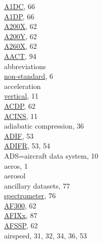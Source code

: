 \documentclass[
  english,
]{book}
\begin{document}
\href{./5-cloud-physics-variables.html\#a1dc-a1dp}{A1DC}, 66\\
\href{./5-cloud-physics-variables.html\#a1dc-a1dp}{A1DP}, 66\\
\href{./5-cloud-physics-variables.html\#CRPC}{A200X}, 62\\
\href{./5-cloud-physics-variables.html\#CRPC}{A200Y}, 62\\
\href{./5-cloud-physics-variables.html\#CRPC}{A260X}, 62\\
\href{./10-obsolete-variables.html\#AACT}{AACT}, 94\\
abbreviations\\
\hspace*{0.333em}\hspace*{0.333em}\href{./2-general-information-about-data-files.html\#units-and-abbreviations}{non-standard},
6\\
acceleration\\
\hspace*{0.333em}\hspace*{0.333em}\href{./3-the-state-of-the-aircraft.html\#ACINS}{vertical},
11\\
\href{./5-cloud-physics-variables.html\#CRPC}{ACDP}, 62\\
\href{./3-the-state-of-the-aircraft.html\#ACINS}{ACINS}, 11\\
adiabatic compression, 36\\
\href{./4-the-state-of-the-atmosphere.html\#adifr}{ADIF}, 53\\
\href{./4-the-state-of-the-atmosphere.html\#adifr}{ADIFR}, 53, 54\\
ADS=aircraft data system, 10\\
aeros, 1\\
aerosol\\
\hspace*{0.333em}\hspace*{0.333em}ancillary datasets, 77\\
\hspace*{0.333em}\hspace*{0.333em}\href{./7-aerosol-particle-measurements.html\#aerosol-spec}{spectrometer},
76\\
\href{./5-cloud-physics-variables.html\#CRPC}{AF300}, 62\\
\href{./10-obsolete-variables.html\#vanes}{AFIXx}, 87\\
\href{./5-cloud-physics-variables.html\#CRPC}{AFSSP}, 62\\
airspeed, 31, 32, 34, 36, 53\\
\end{document}
